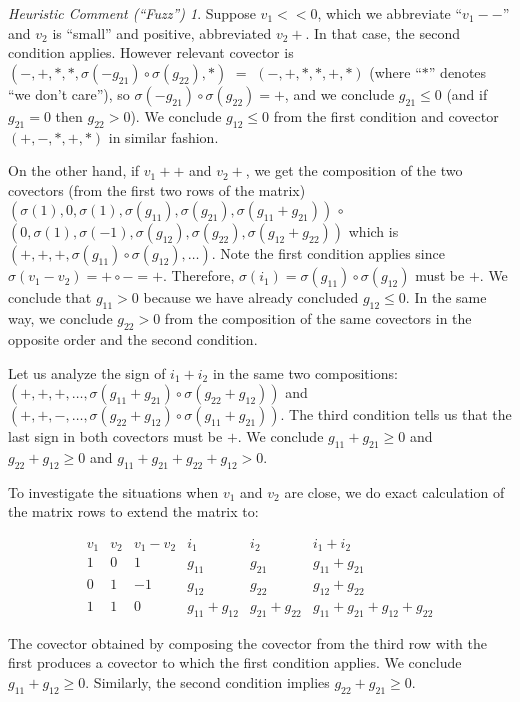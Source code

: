 \documentclass{amsproc-sunycstr}
\theoremstyle{plain}
\theoremstyle{definition}
\theoremstyle{remark}
\newtheorem{fuzz}{Heuristic Comment (``Fuzz'')}
\begin{document}
\begin{fuzz}
{Suppose $v_1<<0$, which we abbreviate ``$v_1--$'' and $v_2$ is ``small'' and
positive, abbreviated $v_2+$.  In that case, the second condition applies.
However relevant covector is \\
$(-,+,*,*,\sigma(-g_{21})\circ\sigma(g_{22}),*)$
$=$ $(-,+,*,*,+,*)$
(where ``$*$'' denotes ``we don't care''), so 
$\sigma(-g_{21})\circ\sigma(g_{22})=+$, and we conclude $g_{21}\leq 0$ 
(and if $g_{21}=0$ then $g_{22}>0$).  We conclude $g_{12}\leq 0$ from the first 
condition and covector $(+,-,*,+,*)$ in similar fashion.



On the other hand, if $v_1++$ and $v_2+$, we get the composition
of the two covectors (from the first two rows of the matrix)
$(\sigma(1), 0 ,\sigma(1), \sigma(g_{11}),\sigma(g_{21}),\sigma(g_{11} + g_{21}))$
$\circ$\\
$(0, \sigma(1) ,\sigma(-1), \sigma(g_{12}),\sigma(g_{22}),\sigma(g_{12} + g_{22}))$
which is\\
$(+, + ,+, \sigma(g_{11})\circ\sigma(g_{12}),\ldots)$.  Note the first condition 
applies since $\sigma(v_1-v_2)=+\circ-=+$.  Therefore, 
$\sigma(i_1)= \sigma(g_{11})\circ\sigma(g_{12})$ must be $+$.  We conclude that
$g_{11}>0$ because we have already concluded $g_{12}\leq 0$.  In the same way, 
we conclude $g_{22}>0$ from the composition of the same covectors in the 
opposite order and the second condition.

Let us analyze the sign of $i_1+i_2$ in the same two compositions:
$(+,+,+,\ldots,\sigma(g_{11}+g_{21})\circ\sigma(g_{22}+g_{12}))$
and 
$(+,+,-,\ldots,\sigma(g_{22}+g_{12})\circ\sigma(g_{11}+g_{21}))$.
The third condition tells us that the last sign in both covectors must
be $+$.  We conclude $g_{11}+g_{21}\geq 0$ and $g_{22}+g_{12}\geq 0$ and
$g_{11}+g_{21}+ g_{22}+g_{12}> 0$.


To investigate the situations when $v_1$ and $v_2$ are close, we do exact 
calculation of the matrix rows to extend the matrix to:

\[
\begin{array}{cccccc} 
v_1 & v_2 & v_1-v_2 & i_1 & i_2 & i_1+i_2\\ \hline
1   &  0  & 1  & g_{11} & g_{21} &g_{11} + g_{21} \\
0   &  1  & -1 & g_{12} & g_{22} &  g_{12} + g_{22} \\
1   &  1  & 0 & g_{11}+g_{12} & g_{21}+g_{22} &  g_{11}+g_{21}+g_{12} + g_{22} 
\end{array}
\]

The covector obtained by composing the covector from the third 
row with the first produces a covector to which the first condition applies.
We conclude $g_{11}+g_{12}\geq 0$.  Similarly, the second condition
implies $g_{22}+g_{21}\geq 0$.

}
\end{fuzz}
\end{document}
